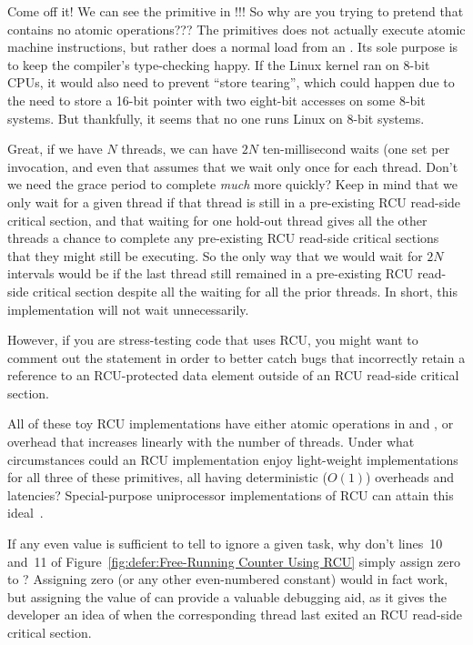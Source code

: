 \QuickQ{}
	Come off it!
	We can see the  primitive in
	!!!
	So why are you trying to pretend that 
	contains no atomic operations???
\QuickA{}
	The  primitives does not actually execute
	atomic machine instructions, but rather does a normal load
	from an .
	Its sole purpose is to keep the compiler's type-checking happy.
	If the Linux kernel ran on 8-bit CPUs, it would also need to
	prevent ``store tearing'', which could happen due to the need
	to store a 16-bit pointer with two eight-bit accesses on some
	8-bit systems.
	But thankfully, it seems that no one runs Linux on 8-bit systems.

\QuickQ{}
	Great, if we have $N$ threads, we can have $2N$ ten-millisecond
	waits (one set per  invocation,
	and even that assumes that we wait only once for each thread.
	Don't we need the grace period to complete \emph{much} more quickly?
\QuickA{}
	Keep in mind that we only wait for a given thread if that thread
	is still in a pre-existing RCU read-side critical section,
	and that waiting for one hold-out thread gives all the other
	threads a chance to complete any pre-existing RCU read-side
	critical sections that they might still be executing.
	So the only way that we would wait for $2N$ intervals
	would be if the last thread still remained in a pre-existing
	RCU read-side critical section despite all the waiting for
	all the prior threads.
	In short, this implementation will not wait unnecessarily.

	However, if you are stress-testing code that uses RCU, you
	might want to comment out the  statement in
	order to better catch bugs that incorrectly retain a reference
	to an RCU-protected data element outside of an RCU
	read-side critical section.

\QuickQ{}
	All of these toy RCU implementations have either atomic operations
	in  and ,
	or 
	overhead that increases linearly with the number of threads.
	Under what circumstances could an RCU implementation enjoy
	light-weight implementations for all three of these primitives,
	all having deterministic ($O\left(1\right)$) overheads and latencies?
\QuickA{}
	Special-purpose uniprocessor implementations of RCU can attain
	this ideal~\cite{PaulEMcKenney2009BloatwatchRCU}.

\QuickQ{}
	If any even value is sufficient to tell 
	to ignore a given task, why don't lines~10 and~11 of
	Figure~\ref{fig:defer:Free-Running Counter Using RCU}
	simply assign zero to ?
\QuickA{}
	Assigning zero (or any other even-numbered constant)
	would in fact work, but assigning the value of
	 can provide a valuable debugging aid,
	as it gives the developer an idea of when the corresponding
	thread last exited an RCU read-side critical section.

